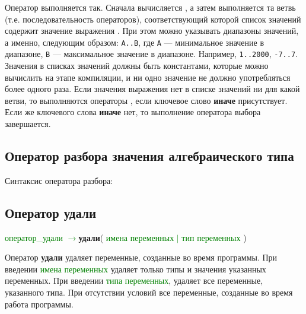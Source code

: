 \documentclass[10pt]{report}
\begin{document}
Оператор выполняется так. Сначала вычисляется \textcolor{Green}{}, а затем выполняется та ветвь (т.е. последовательность операторов),
соответствующий которой список значений содержит значение выражения \textcolor{Green}{}. При этом можно указывать диапазоны значений,
а именно, следующим образом: \texttt{A..B}, где \texttt{A} --- минимальное значение в диапазоне, \texttt{B} --- максимальное значение в диапазоне. Например,
\texttt{1..2000}, \texttt{-7..7}. Значения в списках значений должны быть константами, которые можно вычислить на этапе компиляции, и ни одно значение не должно употребляться
более одного раза. Если значения выражения \textcolor{Green}{} нет в списке значений ни для какой ветви, то выполняются операторы
\textcolor{Green}{}, если ключевое слово \textbf{иначе} присутствует. Если же ключевого слова \textbf{иначе} нет, то выполнение оператора выбора
завершается.

    \subsection{Оператор разбора значения алгебраического типа}
Синтаксис оператора разбора:

\textcolor{Green}{}

 
    \subsection{Оператор удали}
      \begin{center}
    \textcolor{Green}{оператор_удали $\rightarrow$}\textbf{удали}( \textcolor{Green}{имена переменных $\vert $ тип переменных} )
 \end{center}
 Оператор  \textbf{\glqq  удали\grqq }  удаляет переменные, созданные во время программы. При введении \textcolor{Green}{имена переменных} удаляет только типы и значения указанных переменных. При введении \textcolor{Green}{типа переменных}, удаляет все переменные, указанного типа. При отсутствии условий все переменные, созданные во время работа программы. 
\end{document}
